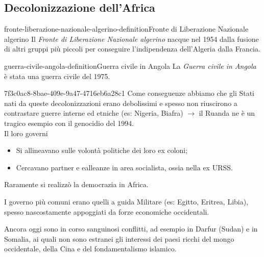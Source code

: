 \documentclass[preview]{standalone}
\begin{document}
\subsection{Decolonizzazione dell'Africa}


\begin{snippetdefinition}{fronte-liberazione-nazionale-algerino-definition}{Fronte di Liberazione Nazionale algerino}
    Il \textit{Fronte di Liberazione Nazionale algerino}
    nacque nel 1954 dalla fusione di altri gruppi più piccoli per conseguire l'indipendenza
    dell'Algeria dalla Francia. 
\end{snippetdefinition}


\begin{snippetdefinition}{guerra-civile-angola-definition}{Guerra civile in Angola}
    La \textit{Guerra civile in Angola} è stata una guerra civile del 1975.
\end{snippetdefinition}

\begin{snippet}{7f3c0ac8-8bae-409e-9a47-4716eb6a28c1}
    Come conseguenze abbiamo che gli Stati nati da queste decolonizzazioni
    erano debolissimi e spesso non riuscirono a
    contrastare guerre interne ed etniche (es: Nigeria, Biafra)
    \(\rightarrow\) il Ruanda ne è un tragico esempio con il genocidio del 1994.
    \\
    Il loro governi
    \begin{itemize}
        \item Si allineavano sulle volontà politiche dei loro ex coloni;
        \item Cercavano partner e ealleanze in area socialista, ossia nella ex URSS.
    \end{itemize}
    Raramente si realizzò la democrazia in Africa.

    I governo più comuni erano quelli a guida Militare (es: Egitto, Eritrea, Libia),
    spesso nascostamente appoggiati da forze economiche occidentali.

    Ancora oggi sono in corso sanguinosi conflitti, ad esempio in Darfur (Sudan)
    e in Somalia, ai quali non sono estranei gli interessi dei paesi ricchi del mongo
    occidentale, della Cina e del fondamentalismo islamico.
\end{snippet}
\end{document}
